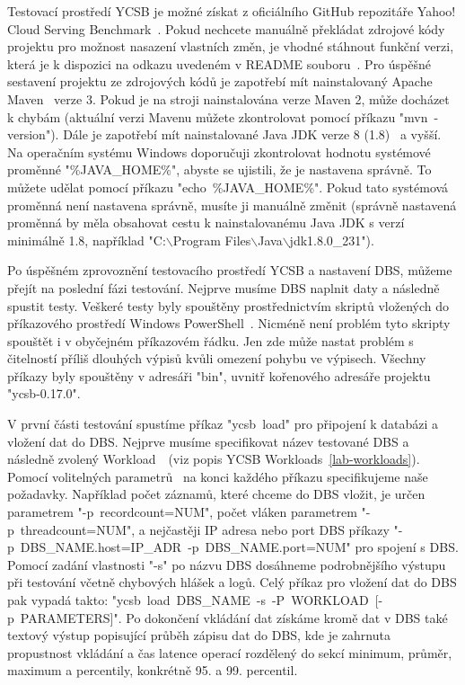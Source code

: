 \documentclass[czech,master,dept460,male,csharp,cpdeclaration]{diploma}
\begin{document}
	Testovací prostředí YCSB je možné získat z oficiálního GitHub repozitáře Yahoo! Cloud Serving Benchmark~\cite{ycsb}. Pokud nechcete manuálně překládat zdrojové kódy projektu pro možnost nasazení vlastních změn, je vhodné stáhnout funkční verzi, která je k dispozici na odkazu uvedeném v README souboru~\cite{ycsb-download}. Pro úspěšné sestavení projektu ze zdrojových kódů je zapotřebí mít nainstalovaný Apache Maven~\cite{maven} verze 3. Pokud je na stroji nainstalována verze Maven 2, může docházet k chybám (aktuální verzi Mavenu můžete zkontrolovat pomocí příkazu "mvn~-version"). Dále je zapotřebí mít nainstalované Java JDK verze 8 (1.8)~\cite{java-jdk} a vyšší. Na operačním systému Windows doporučuji zkontrolovat hodnotu systémové proměnné "\%JAVA\_HOME\%", abyste se ujistili, že je nastavena správně. To můžete udělat pomocí příkazu "echo~\%JAVA\_HOME\%". Pokud tato systémová proměnná není nastavena správně, musíte ji manuálně změnit (správně nastavená proměnná by měla obsahovat cestu k nainstalovanému Java JDK s verzí minimálně 1.8, například  "C:$\backslash$Program Files$\backslash$Java$\backslash$jdk1.8.0\_231").
	
	Po úspěšném zprovoznění testovacího prostředí YCSB a nastavení DBS, můžeme přejít na poslední fázi testování. Nejprve musíme DBS naplnit daty a následně spustit testy. Veškeré testy byly spouštěny prostřednictvím skriptů vložených do příkazového prostředí Windows PowerShell~\cite{win-powershell}. Nicméně není problém tyto skripty spouštět i v obyčejném příkazovém řádku. Jen zde může nastat problém s čitelností příliš dlouhých výpisů kvůli omezení pohybu ve výpisech. Všechny příkazy byly spouštěny v adresáři "bin", uvnitř kořenového adresáře projektu "ycsb-0.17.0".
	
	V první části testování spustíme příkaz "ycsb~load" pro připojení k databázi a vložení dat do DBS. Nejprve musíme specifikovat název testované DBS a následně zvolený Workload~\cite{workloads}~(viz popis YCSB Workloads~\ref{lab-workloads}). Pomocí volitelných parametrů~\cite{ycsb-properties} na konci každého příkazu specifikujeme naše požadavky. Například počet záznamů, které chceme do DBS vložit, je určen parametrem "-p~recordcount=NUM", počet vláken parametrem "-p~threadcount=NUM", a nejčastěji IP adresa nebo port DBS příkazy "-p~DBS\_NAME.host=IP\_ADR~-p~DBS\_NAME.port=NUM" pro spojení s DBS. Pomocí zadání vlastnosti "-s" po názvu DBS dosáhneme podrobnějšího výstupu při testování včetně chybových hlášek a logů. Celý příkaz pro vložení dat do DBS pak vypadá takto: "ycsb~load~DBS\_NAME~-s~-P~WORKLOAD~[-p~PARAMETERS]". Po dokončení vkládání dat získáme kromě dat v DBS také textový výstup popisující průběh zápisu dat do DBS, kde je zahrnuta propustnost vkládání a čas latence operací rozdělený do sekcí minimum, průměr, maximum a percentily, konkrétně 95. a 99. percentil.
	
\end{document}
